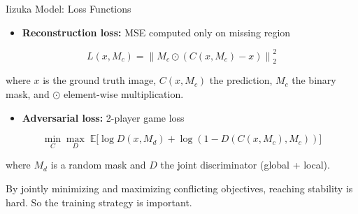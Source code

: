 \documentclass[aspectratio=43]{beamer}
\begin{document}
	\begin{frame}{Iizuka Model: Loss Functions}
		
		\begin{itemize}
			\item \textbf{Reconstruction loss:} MSE computed only on missing region
		\end{itemize}
		
		\begin{equation*}
			L(x, M_c) = \left\| M_c \odot (C(x, M_c) - x) \right\|_2^2
		\end{equation*}
		
		where $x$ is the ground truth image, $C(x, M_c)$ the prediction, $M_c$ the binary mask, and $\odot$ element-wise multiplication.
		
		\vspace{0.3cm}
		
		\begin{itemize}
			\item \textbf{Adversarial loss:} 2-player game loss
		\end{itemize}
		
		\begin{equation*}
			\min_C \max_D \; \mathbb{E}\big[ \log D(x, M_d) + \log(1 - D(C(x, M_c), M_c)) \big]
		\end{equation*}
		
		where $M_d$ is a random mask and $D$ the joint discriminator (global + local).
		
		\vspace{0.2cm}
		By jointly minimizing and maximizing conflicting objectives, reaching stability is hard. So the training strategy is important.
		
	\end{frame}
	
\end{document}
